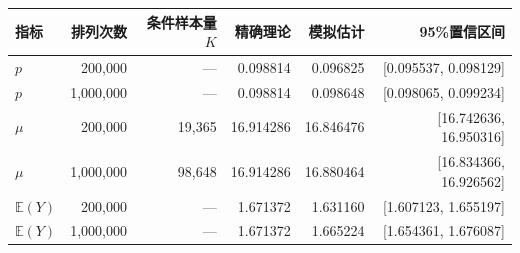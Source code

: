 \begin{tabular}{lrrrrr}
\toprule
指标 & 排列次数 & 条件样本量$K$ & 精确理论 & 模拟估计 & 95\%置信区间 \\
\midrule
$p$ & 200,000 & --- & 0.098814 & 0.096825 & [0.095537, 0.098129] \\
$p$ & 1,000,000 & --- & 0.098814 & 0.098648 & [0.098065, 0.099234] \\
$\mu$ & 200,000 & 19,365 & 16.914286 & 16.846476 & [16.742636, 16.950316] \\
$\mu$ & 1,000,000 & 98,648 & 16.914286 & 16.880464 & [16.834366, 16.926562] \\
$\mathbb E(Y)$ & 200,000 & --- & 1.671372 & 1.631160 & [1.607123, 1.655197] \\
$\mathbb E(Y)$ & 1,000,000 & --- & 1.671372 & 1.665224 & [1.654361, 1.676087] \\
\bottomrule
\end{tabular}
